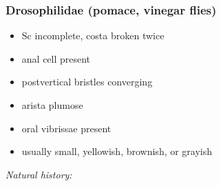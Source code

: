 \documentclass[letterpaper, 11pt]{article}
\begin{document}
\subsubsection{Drosophilidae (pomace, vinegar flies)}
\begin{itemize}
\item Sc incomplete, costa broken twice
\item anal cell present
\item postvertical bristles converging
\item arista plumose
\item oral vibrissae present
\item usually small, yellowish, brownish, or grayish
\end{itemize}

\noindent{}\textit{Natural history:} \\
\end{document}
